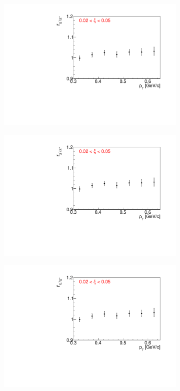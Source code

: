 \begin{figure}[h!]
\begin{subfigure}{.32\textwidth}
		\includegraphics[width=\linewidth, page=5]{chapters/chrgSTAR/img/dEdx/fit2019_fitResult_1_0_step_0.pdf}
	\end{subfigure}
	\begin{subfigure}{.32\textwidth}
		\includegraphics[width=\linewidth, page=6]{chapters/chrgSTAR/img/dEdx/fit2019_fitResult_1_0_step_0.pdf}
	\end{subfigure}
	\begin{subfigure}{.32\textwidth}
		\includegraphics[width=\linewidth, page=7]{chapters/chrgSTAR/img/dEdx/fit2019_fitResult_1_0_step_0.pdf}

\end{subfigure}
\end{figure}
